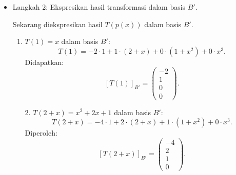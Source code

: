 \documentclass[11pt,letterpaper]{article}
\begin{document}
\begin{enumerate}
\begin{enumerate}
\begin{itemize}
\begin{enumerate}
                          \item $p(x) = 3x^2$:
                                \[
                                  T(x+3x^2) = x(3x^2) + \frac{d}{dx}(3x^2) = x^3 + 3x^2 + (1 + 3x^2)' = 3x^3 + x^2 + 6x + 1?
                                \]
                                (koreksi sesuai konteks: untuk $p(x)=3x^2$, maka
                                \[
                                  T(3x^2) = x(3x^2) + \frac{d}{dx}(3x^2) = 3x^3 + 6x.
                                \]
                                Jadi, $T(3x^2) = 3x^3 + 6x$.)
                        \end{enumerate}
                  \item Langkah 2: Ekspresikan hasil transformasi dalam basis $B'$.

                        Sekarang diekspresikan hasil $T(p(x))$ dalam basis $B'$.

                        \begin{enumerate}
                          \item $T(1) = x$ dalam basis $B'$:
                                \[
                                  T(1) = -2 \cdot 1 + 1 \cdot (2+x) + 0 \cdot (1+x^2) + 0 \cdot x^3.
                                \]
                                Didapatkan:
                                \[
                                  [T(1)]_{B'} =
                                  \begin{pmatrix}
                                    -2 \\ 1 \\ 0 \\ 0
                                  \end{pmatrix}.
                                \]

                                2. $T(2+x) = x^2 + 2x + 1$ dalam basis $B'$:
                                \[
                                  T(2+x) = -4 \cdot 1 + 2 \cdot (2+x) + 1 \cdot (1+x^2) + 0 \cdot x^3.
                                \]
                                Diperoleh:
                                \[
                                  [T(2+x)]_{B'} =
                                  \begin{pmatrix}
                                    -4 \\ 2 \\ 1 \\ 0
                                  \end{pmatrix}.
                                \]


\end{enumerate}
\end{itemize}
\end{enumerate}
\end{enumerate}
\end{document}
